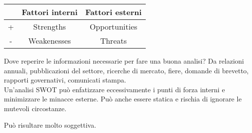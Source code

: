 \documentclass[a4paper,portrait,12pt]{article}
\theoremstyle{definition}
\begin{document}
\begin{table}[H]
\begin{center}
\begin{tabular}{c|c|c}
   & Fattori interni & Fattori esterni \\
   \hline
 + & Strengths & Opportunities \\
 \hline
 - & Weakenesses & Threats \\
\end{tabular}
\end{center}
\end{table}

Dove reperire le informazioni necessarie per fare una buona analisi?
Da relazioni annuali, pubblicazioni del settore, ricerche di mercato, fiere, domande di brevetto, rapporti governativi, comunicati stampa.\\

Un'analisi SWOT può enfatizzare eccessivamente i punti di forza interni e minimizzare le minacce esterne.
Può anche essere statica e rischia di ignorare le mutevoli circostanze.

Può risultare molto soggettiva.
\end{document}
